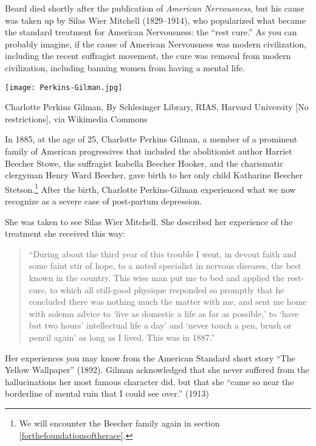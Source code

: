 Beard died shortly after the publication of \emph{American Nervousness}, but his cause was taken up by Silas Wier Mitchell (1829--1914), who popularized what became the standard treatment for American Nervousness: the ``rest cure.'' As you can probably imagine, if the cause of American Nervousness was modern civilization, including the recent suffragist movement, the cure was removal from modern civilization, including banning women from having a mental life.

\begin{marginfigure}\texttt{[image: Perkins-Gilman.jpg]}\caption{Charlotte Perkins Gilman, By Schlesinger Library, RIAS, Harvard University [No restrictions], via Wikimedia Commons}\label{fig:perkins-gilman}\end{marginfigure}In 1885, at the age of 25, Charlotte Perkins Gilman, a member of a prominent family of American progressives that included the abolitionist author Harriet Beecher Stowe, the suffragist Isabella Beecher Hooker, and the charismatic clergyman Henry Ward Beecher, gave birth to her only child Katharine Beecher Stetson.\footnote{We will encounter the Beecher family again in section \ref{forthefoundationsoftherace}.} After the birth, Charlotte Perkins-Gilman experienced what we now recognize as a severe case of post-partum depression.

She was taken to see Silas Wier Mitchell. She described her experience of the treatment she received this way:

\begin{quote}

``During about the third year of this trouble I went, in devout faith and some faint stir of hope, to a noted specialist in nervous diseases, the best known in the country. This wise man put me to bed and applied the rest-cure, to which all still-good physique responded so promptly that he concluded there was nothing much the matter with me, and sent me home with solemn advice to `live as domestic a life as far as possible,' to `have but two hours' intellectual life a day' and `never touch a pen, brush or pencil again' as long as I lived. This was in 1887.''~\citep{PerkinsGilman:1899ut}
\end{quote}

Her experiences you may know from the American Standard short story ``The Yellow Wallpaper'' (1892). Gilman acknowledged that she never suffered from the hallucinations her most famous character did, but that she ``came so near the borderline of mental ruin that I could see over.'' (1913)

